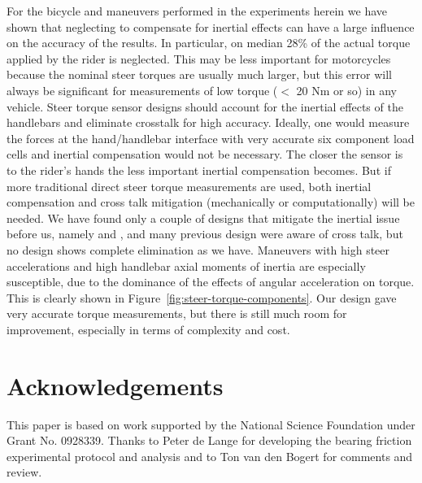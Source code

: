\documentclass[a4paper]{article}
\begin{document}
For the bicycle and maneuvers performed in the experiments herein we have shown
that neglecting to compensate for inertial effects can have a large influence
on the accuracy of the results. In particular, on median 28\% of the actual
torque applied by the rider is neglected. This may be less important for
motorcycles because the nominal steer torques are usually much larger, but this
error will always be significant for measurements of low torque ($<$ 20 Nm or
so) in any vehicle. Steer torque sensor designs should account for the inertial
effects of the handlebars and eliminate crosstalk for high accuracy. Ideally,
one would measure the forces at the hand/handlebar interface with very accurate
six component load cells and inertial compensation would not be necessary. The
closer the sensor is to the rider's hands the less important inertial
compensation becomes. But if more traditional direct steer torque measurements
are used, both inertial compensation and cross talk mitigation (mechanically or
computationally) will be needed. We have found only a couple of designs that
mitigate the inertial issue before us, namely \cite{Evertse2010} and
\cite{Iuchi2006}, and many previous design were aware of cross talk, but no
design shows complete elimination as we have. Maneuvers with high steer
accelerations and high handlebar axial moments of inertia are especially
susceptible, due to the dominance of the effects of angular acceleration on
torque. This is clearly shown in Figure~\ref{fig:steer-torque-components}. Our
design gave very accurate torque measurements, but there is still much room for
improvement, especially in terms of complexity and cost.

\section*{Acknowledgements}

This paper is based on work supported by the National Science Foundation under
Grant No. 0928339. Thanks to Peter de Lange for developing the bearing friction
experimental protocol and analysis and to Ton van den Bogert for comments and
review.



\end{document}
